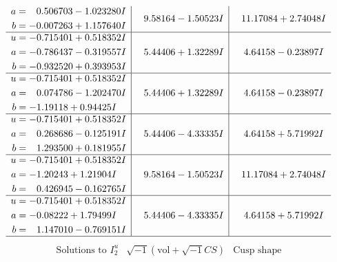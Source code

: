 \documentclass[1p]{elsarticle_modified}
\theoremstyle{definition}
\newcommand{\I}{\sqrt{-1}}
\begin{document}
$$\begin{array}{c|c|c}
\begin{aligned}
a &= \phantom{-}0.506703 - 1.023280 I \\
b &= -0.007263 + 1.157640 I\end{aligned}
 & \phantom{-}9.58164 - 1.50523 I & \phantom{-}11.17084 + 2.74048 I \\ \hline\begin{aligned}
u &= -0.715401 + 0.518352 I \\
a &= -0.786437 - 0.319557 I \\
b &= -0.932520 + 0.393953 I\end{aligned}
 & \phantom{-}5.44406 + 1.32289 I & \phantom{-}4.64158 - 0.23897 I \\ \hline\begin{aligned}
u &= -0.715401 + 0.518352 I \\
a &= \phantom{-}0.074786 - 1.202470 I \\
b &= -1.19118 + 0.94425 I\end{aligned}
 & \phantom{-}5.44406 + 1.32289 I & \phantom{-}4.64158 - 0.23897 I \\ \hline\begin{aligned}
u &= -0.715401 + 0.518352 I \\
a &= \phantom{-}0.268686 - 0.125191 I \\
b &= \phantom{-}1.293500 + 0.181955 I\end{aligned}
 & \phantom{-}5.44406 - 4.33335 I & \phantom{-}4.64158 + 5.71992 I \\ \hline\begin{aligned}
u &= -0.715401 + 0.518352 I \\
a &= -1.20243 + 1.21904 I \\
b &= \phantom{-}0.426945 - 0.162765 I\end{aligned}
 & \phantom{-}9.58164 - 1.50523 I & \phantom{-}11.17084 + 2.74048 I \\ \hline\begin{aligned}
u &= -0.715401 + 0.518352 I \\
a &= -0.08222 + 1.79499 I \\
b &= \phantom{-}1.147010 - 0.769151 I\end{aligned}
 & \phantom{-}5.44406 - 4.33335 I & \phantom{-}4.64158 + 5.71992 I\\
 \hline 
 \end{array}$$\newpage$$\begin{array}{c|c|c}  
\text{Solutions to }I^u_{2}& \I (\text{vol} + \sqrt{-1}CS) & \text{Cusp shape}\\
 \hline 
\begin{aligned}

\end{aligned}
\end{array}$$
\end{document}
